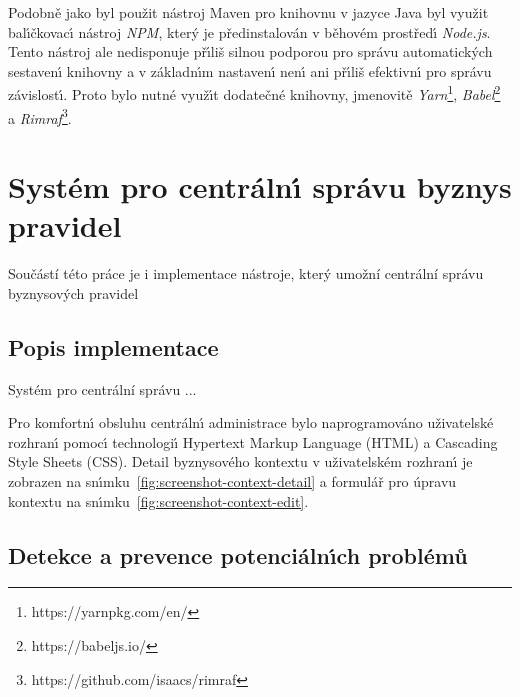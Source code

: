 Podobně jako byl použit nástroj Maven pro knihovnu v jazyce Java byl
využit bal\'{\i}čkovac\'{\i} nástroj \textit{NPM}, kter\'y je předinstalován
v běhovém prostřed\'{\i} \textit{Node.js}. Tento nástroj ale nedisponuje
př\'{\i}liš silnou podporou pro správu automatick\'ych sestaven\'{\i} knihovny
a v základn\'{\i}m nastaven\'{\i} nen\'{\i} ani př\'{\i}liš efektivn\'{\i} pro správu závislost\'{\i}.
Proto bylo nutné využ\'{\i}t dodatečné knihovny, jmenovitě
\textit{Yarn}\footnote{https://yarnpkg.com/en/}, \textit{Babel}\footnote{https://babeljs.io/} a
\textit{Rimraf}\footnote{https://github.com/isaacs/rimraf}.

\section{Systém pro centráln\'{\i} správu byznys pravidel}\label{sec:central-administration}

Součástí této práce je i implementace nástroje, který umožní centrální správu byznysových
pravidel
\subsection{Popis implementace}

Systém pro centrální správu ...

Pro komfortn\'{\i} obsluhu centráln\'{\i} administrace bylo naprogramováno
uživatelské rozhran\'{\i} pomoc\'{\i} technologi\'{\i} Hypertext Markup Language
(HTML) a Cascading Style Sheets (\gls{CSS}).
Detail byznysového kontextu v uživatelském rozhran\'{\i} je zobrazen
na sn\'{\i}mku~\ref{fig:screenshot-context-detail} a formulář pro úpravu kontextu
na sn\'{\i}mku~\ref{fig:screenshot-context-edit}.


\subsection{Detekce a prevence potenciáln\'{\i}ch problémů}

